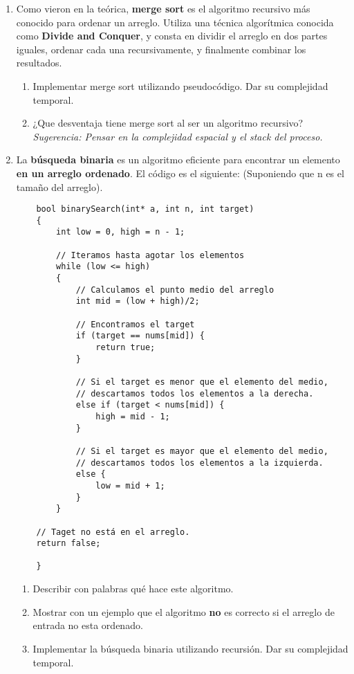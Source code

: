\documentclass[titlepage,oneside]{book}
\begin{document}
\begin{enumerate}
        \item Como vieron en la teórica, \textbf{merge sort} es el algoritmo recursivo más conocido para ordenar un arreglo. Utiliza una técnica algorítmica conocida como \textbf{Divide and Conquer}, y consta en dividir el arreglo en dos partes iguales, ordenar cada una recursivamente, y finalmente combinar los resultados.
        \begin{enumerate}
            \item Implementar merge sort utilizando pseudocódigo. Dar su complejidad temporal.
            \item ¿Que desventaja tiene merge sort al ser un algoritmo recursivo? \newline\textit{Sugerencia: Pensar en la complejidad espacial y el stack del proceso.}
        \end{enumerate}

        \item La \textbf{búsqueda binaria} es un algoritmo eficiente para encontrar un elemento \textbf{en un arreglo ordenado}. El código es el siguiente: (Suponiendo que n es el tamaño del arreglo).

            \begin{verbatim}
    bool binarySearch(int* a, int n, int target)
    {
        int low = 0, high = n - 1;
        
        // Iteramos hasta agotar los elementos
        while (low <= high)
        {
            // Calculamos el punto medio del arreglo
            int mid = (low + high)/2;
            
            // Encontramos el target
            if (target == nums[mid]) {
                return true;
            }
     
            // Si el target es menor que el elemento del medio, 
            // descartamos todos los elementos a la derecha.
            else if (target < nums[mid]) {
                high = mid - 1;
            }
     
            // Si el target es mayor que el elemento del medio, 
            // descartamos todos los elementos a la izquierda.
            else {
                low = mid + 1;
            }
        }
 
    // Taget no está en el arreglo.
    return false;

    }
    \end{verbatim} 

    \begin{enumerate}
        \item Describir con palabras qué hace este algoritmo.
        \item Mostrar con un ejemplo que el algoritmo \textbf{no} es correcto si el arreglo de entrada no esta ordenado.
        \item Implementar la búsqueda binaria utilizando recursión. Dar su complejidad temporal.
    \end{enumerate}


\end{enumerate}
\end{document}
